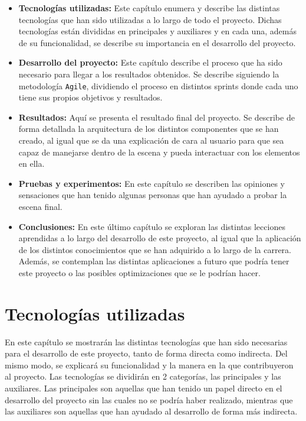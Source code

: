 \documentclass[a4paper, 12pt]{book}
\begin{document}
\begin{itemize}
  \item \textbf{Tecnologías utilizadas:} Este capítulo enumera y describe las distintas tecnologías que han sido utilizadas a lo largo de todo el proyecto. Dichas tecnologías están divididas en principales y auxiliares y en cada una, además de su funcionalidad, se describe su importancia en el desarrollo del proyecto.
  \item \textbf{Desarrollo del proyecto:} Este capítulo describe el proceso que ha sido necesario para llegar a los resultados obtenidos. Se describe siguiendo la metodología \texttt{Agile}, dividiendo el proceso en distintos sprints donde cada uno tiene sus propios objetivos y resultados.
  \item \textbf{Resultados:} Aquí se presenta el resultado final del proyecto. Se describe de forma detallada la arquitectura de los distintos componentes que se han creado, al igual que se da una explicación de cara al usuario para que sea capaz de manejarse dentro de la escena y pueda interactuar con los elementos en ella. 
  \item \textbf{Pruebas y experimentos:} En este capítulo se describen las opiniones y sensaciones que han tenido algunas personas que han ayudado a probar la escena final. 
  \item \textbf{Conclusiones:} En este último capítulo se exploran las distintas lecciones aprendidas a lo largo del desarrollo de este proyecto, al igual que la aplicación de los distintos conocimientos que se han adquirido a lo largo de la carrera. Además, se contemplan las distintas aplicaciones a futuro que podría tener este proyecto o las posibles optimizaciones que se le podrían hacer.
\end{itemize}



\cleardoublepage %
\chapter{Tecnologías utilizadas} 
\label{chap:tecnologias} %
En este capítulo se mostrarán las distintas tecnologías que han sido necesarias para el desarrollo de este proyecto, tanto de forma directa como indirecta. Del mismo modo, se explicará su funcionalidad
y la manera en la que contribuyeron al proyecto. Las tecnologías se dividirán en 2 categorías, las principales y las auxiliares. Las principales son aquellas que han tenido un papel directo en el desarrollo 
del proyecto sin las cuales no se podría haber realizado, mientras que las auxiliares son aquellas que han ayudado al desarrollo de forma más indirecta.  
\end{document}
